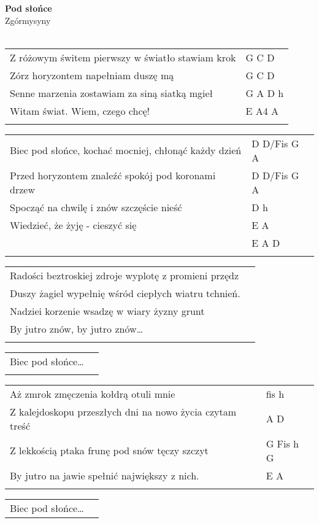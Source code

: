 \documentclass[a5paper]{article}
\begin{document}


\noindent
\fontsize{12pt}{15pt}\selectfont
\textbf{Pod słońce} \\
\fontsize{8pt}{10pt}\selectfont
Zgórmysyny \\ \\
\fontsize{10pt}{12pt}\selectfont
{}
\begin{tabular}{@{}p{9.20cm}p{3cm}@{}}
\noindent
Z różowym świtem pierwszy w światło stawiam krok & G C D \\
Zórz horyzontem napełniam duszę mą & G C D \\
Senne marzenia zostawiam za siną siatką mgieł & G A D h \\
Witam świat. Wiem, czego chcę! & E A4 A \\ \\
\end{tabular}

\noindent
\begin{tabular}{@{}p{8.20cm}p{3cm}@{}}
Biec pod słońce, kochać mocniej, chłonąć każdy dzień & D D/Fis G A \\
Przed horyzontem znaleźć spokój pod koronami drzew & D D/Fis G A \\
Spocząć na chwilę i znów szczęście nieść & D h \\
Wiedzieć, że żyję - cieszyć się & E A \\
								& E A D \\ \\
\end{tabular}

\noindent
\begin{tabular}{@{}p{8.20cm}p{3cm}@{}}
Radości beztroskiej zdroje wyplotę z promieni przędz \\
Duszy żagiel wypełnię wśród ciepłych wiatru tchnień. \\
Nadziei korzenie wsadzę w wiary żyzny grunt \\
By jutro znów, by jutro znów… \\ \\
\end{tabular}

\noindent
\begin{tabular}{@{}p{8.20cm}p{3cm}@{}}
Biec pod słońce… \\ \\
\end{tabular}

\noindent
\begin{tabular}{@{}p{9.20cm}p{3cm}@{}}
Aż zmrok zmęczenia kołdrą otuli mnie & fis h \\
Z kalejdoskopu przeszłych dni na nowo życia czytam treść & A D \\
Z lekkością ptaka frunę pod snów tęczy szczyt & G Fis h G \\
By jutro na jawie spełnić największy z nich. & E A \\ \\
\end{tabular}

\noindent
\begin{tabular}{@{}p{8.20cm}p{3cm}@{}}
Biec pod słońce…
\end{tabular}
\end{document}
